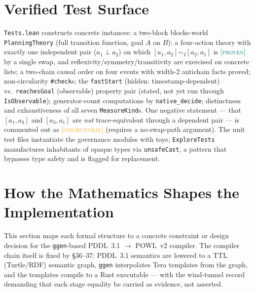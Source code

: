 \documentclass[11pt]{article}
\newcommand{\PROVEN}{\textcolor{teal}{\textsc{[proven]}}}
\newcommand{\CONJECTURAL}{\textcolor{orange}{\textsc{[conjectural]}}}
\newcommand{\traceEq}[1]{\sim_{#1}}            %
\theoremstyle{plain}
\theoremstyle{definition}
\begin{document}
\section{Verified Test Surface}
\label{sec:tests}
\texttt{Tests.lean} constructs concrete instances: a two-block blocks-world
\texttt{PlanningTheory} (full transition function, goal $A$ on $B$); a
four-action theory with exactly one independent pair
($a_1 \perp a_2$) on which
$[a_1, a_2] \traceEq{I} [a_2, a_1]$ is \PROVEN{} by a single swap, and
reflexivity/symmetry/transitivity are exercised on concrete lists; a
two-chain causal order on four events with width-2 antichain facts proved;
non-circularity \texttt{\#check}s; the \texttt{fastStart} (hidden:
timestamp-dependent) vs.\ \texttt{reachesGoal} (observable) property pair
(stated, not yet run through \texttt{IsObservable}); generator-count
computations by \texttt{native\_decide}; distinctness and exhaustiveness of
all seven \texttt{MeasureKind}s. One negative statement --- that
$[a_1, a_3]$ and $[a_3, a_1]$ are \emph{not} trace-equivalent through a
dependent pair --- is commented out as \CONJECTURAL{} (requires a
no-swap-path argument). The unit test files instantiate the governance
modules with toys; \texttt{ExploreTests} manufactures inhabitants of opaque
types via \texttt{unsafeCast}, a pattern that bypasses type safety and is
flagged for replacement.

\section{How the Mathematics Shapes the Implementation}
\label{sec:implementation}
This section maps each formal structure to a concrete constraint or design
decision for the \texttt{ggen}-based PDDL~3.1 $\to$ POWL~v2 compiler. The
compiler chain itself is fixed by \S36--37: PDDL~3.1 semantics are lowered
to a TTL (Turtle/RDF) semantic graph, \texttt{ggen} interpolates Tera
templates from the graph, and the templates compile to a Rust executable ---
with the wind-tunnel record demanding that each stage equality be carried as
evidence, not asserted.
\end{document}
